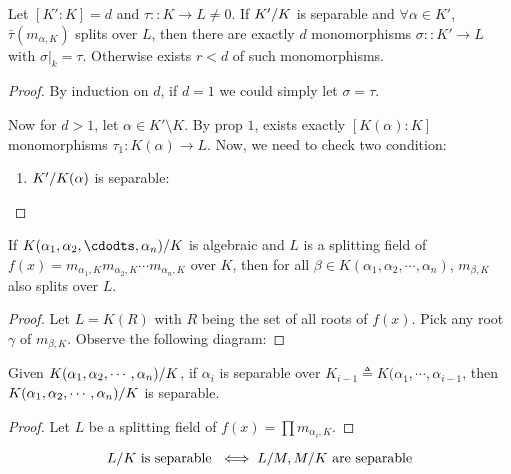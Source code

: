 \begin{prop}
  Let $[K': K] = d$ and $\tau:: K \to L \neq 0$. If ${K'}/{K}$ is separable and $\forall \alpha \in K'$,
  $\bar\tau(m_{\alpha, K})$ splits over $L$, then there are exactly $d$ monomorphisms $\sigma::K' \to L$ with
  $\sigma\big|_k = \tau$. Otherwise exists $r < d$ of such monomorphisms.

  \begin{proof}
    By induction on $d$, if $d = 1$ we could simply let $\sigma = \tau$.

    Now for $d > 1$, let $\alpha \in K' \setminus K$.
    By prop $1$, exists exactly $[K(\alpha): K]$ monomorphisms $\tau_1: K(\alpha) \to L$.
    Now, we need to check two condition:
    \begin{enumerate}
        \item ${K'}/{K(\alpha)}$ is separable:
    \end{enumerate}
  \end{proof}
\end{prop}

\begin{lemma}
  If $\quot{K(\alpha_1, \alpha_2, \cdodts, \alpha_n)}{K}$ is algebraic and $L$ is a splitting field of $f(x) = m_{\alpha_1, K}
  m_{\alpha_2, K} \cdots m_{\alpha_n, K}$ over $K$, then for all $\beta \in K(\alpha_1, \alpha_2, \cdots, \alpha_n)$,
  $m_{\beta, K}$ also splits over $L$.

  \begin{proof}
    Let $L = K(R)$ with $R$ being the set of all roots of $f(x)$. Pick any root $\gamma$ of $m_{\beta, K}$.
    Observe the following diagram:
  \end{proof}
\end{lemma}

\begin{theorem}
  Given ${K(\alpha_1, \alpha_2, \cdots, \alpha_n)}/{K}$, if $\alpha_i$ is separable over $K_{i-1} \triangleq K(\alpha_1,
  \cdots, \alpha_{i-1}$, then ${K(\alpha_1, \alpha_2, \cdots, \alpha_n)}/{K}$ is separable.

  \begin{proof}
    Let $L$ be a splitting field of $f(x) = \prod m_{\alpha_i, K}$.
  \end{proof}
\end{theorem}

\begin{theorem}
  \[ {L}/{K} \text{ is separable } \iff {L}/{M}, {M}/{K} \text{ are separable} \]
\end{theorem}
